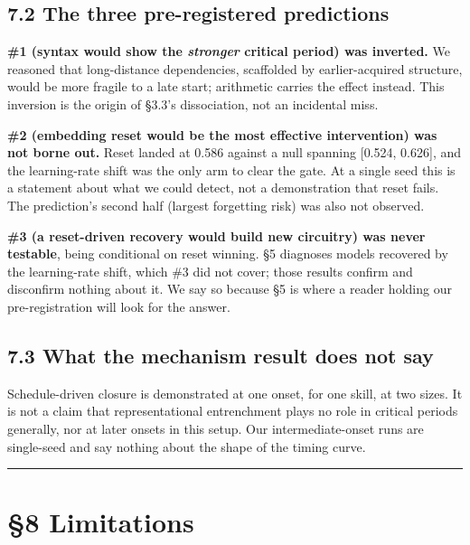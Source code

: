 \documentclass[11pt]{article}
\begin{document}
\subsection{7.2 The three pre-registered predictions}\label{the-three-pre-registered-predictions}

\textbf{\#1 (syntax would show the \emph{stronger} critical period) was inverted.} We reasoned that
long-distance dependencies, scaffolded by earlier-acquired structure, would be more fragile
to a late start; arithmetic carries the effect instead. This inversion is the origin of
§3.3's dissociation, not an incidental miss.

\textbf{\#2 (embedding reset would be the most effective intervention) was not borne out.} Reset
landed at 0.586 against a null spanning {[}0.524, 0.626{]}, and the learning-rate shift was the
only arm to clear the gate. At a single seed this is a statement about what we could detect,
not a demonstration that reset fails. The prediction's second half (largest forgetting risk)
was also not observed.

\textbf{\#3 (a reset-driven recovery would build new circuitry) was never testable}, being
conditional on reset winning. §5 diagnoses models recovered by the learning-rate shift, which
\#3 did not cover; those results confirm and disconfirm nothing about it. We say so because §5
is where a reader holding our pre-registration will look for the answer.

\subsection{7.3 What the mechanism result does not say}\label{what-the-mechanism-result-does-not-say}

Schedule-driven closure is demonstrated at one onset, for one skill, at two sizes. It is not
a claim that representational entrenchment plays no role in critical periods generally, nor
at later onsets in this setup. Our intermediate-onset runs are single-seed and say nothing
about the shape of the timing curve.

\begin{center}\rule{0.5\linewidth}{0.5pt}\end{center}

\section{§8 Limitations}\label{limitations}
\end{document}

